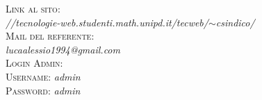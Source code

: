 \documentclass[12pt]{article}
\begin{document}
\begin{titlepage}
		
		\textsc{\Large Link al sito:}\\[0.2cm]	
		\textit{//tecnologie-web.studenti.math.unipd.it/tecweb/$\sim$csindico/}\\[1cm]
		
		\textsc{\Large Mail del referente:}\\[0.2cm]	
		\textit{lucaalessio1994@gmail.com}\\[1cm]
		
		
			\textsc{\Large Login Admin:}\\[0.2cm]
			\textsc{ Username:}\textit{ admin }\\[0.1mm]
			\textsc{ Password:}\textit{ admin }\\[0.1mm]
			
		\vfill
	\end{titlepage}
	
	\newpage
	\renewcommand{\contentsname}{Indice}
	\tableofcontents
	
	
	\newpage
	
\end{document}
